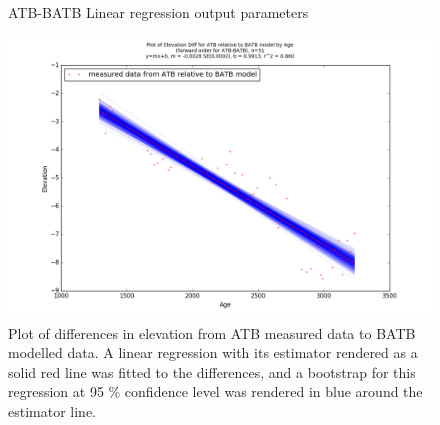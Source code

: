\begin{figure}[H]
	\begin{flushleft}
	\end{flushleft}
	\caption{ATB-BATB Linear regression output parameters}
	\label{fig:ATBxBATB_regression}
\end{figure}

\newpage

\begin{figure}[H]
	\includegraphics[width=1.7\linewidth, angle=270 ]{data/bothNonZero/withinSeventyFivePercent/gias/theGIA_ATB_relative_to_BATB.png}
	\caption{Plot of differences in elevation from ATB measured data to BATB modelled data. A linear regression with its estimator rendered as
	 a solid red line was fitted to the differences, and a bootstrap for this regression at 95 \% confidence level was rendered in blue
	 around the estimator line.}
	\label{fig:gias_ATBxBATB}
\end{figure}


